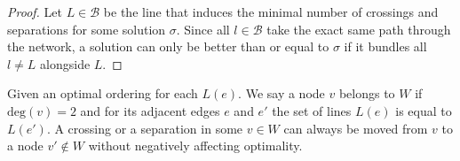\documentclass[sigconf]{acmart}
\begin{document}
\begin{proof}
Let $L \in \mathcal{B}$ be the line that induces the minimal number of crossings and separations for some solution $\sigma$. Since all $l \in \mathcal{B}$ take the exact same path through the network, a solution can only be better than or equal to $\sigma$ if it bundles all $l \neq L$ alongside $L$.
\end{proof}
\begin{lemma}\label{LEM:crossingmoveing}
	Given an optimal ordering for each $L(e)$. We say a node $v$ belongs to $W$ if $\text{deg}(v) = 2$ and for its adjacent edges $e$ and $e'$ the set of lines $L(e)$ is equal to $L(e')$. A crossing or a separation in some $v \in W$ can always be moved from $v$ to a node $v' \not\in W$ without negatively affecting optimality.
\end{lemma}
\end{document}
